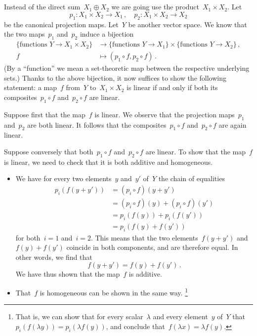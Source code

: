 \subsection{}

Instead of the direct sum~$X_1 ⊕ X_2$ we are going use the product~$X_1 × X_2$.
Let
\[
	p_1 \colon X_1 × X_2 \to X_1 \,,
	\quad
	p_2 \colon X_1 × X_2 \to X_2
\]
be the canonical projection maps.
Let~$Y$ be another vector space.
We know that the two maps~$p_1$ and~$p_2$ induce a bijection
\begin{align*}
	\{ \text{functions~$\textstyle Y \to X_1 × X_2$} \}
	&\to
	\{ \text{functions~$\textstyle Y \to X_1$} \}
	×
	\{ \text{functions~$\textstyle Y \to X_2$} \} \,,
	\\
	f
	&\mapsto
	(p_1 ∘ f, p_2 ∘ f) \,.
\end{align*}
(By a \enquote{function} we mean a set-theoretic map between the respective underlying sets.)
Thanks to the above bijection, it now suffices to show the following statement:
a map~$f$ from~$Y$ to~$X_1 × X_2$ is linear if and only if both its composites~$p_1 ∘ f$ and~$p_2 ∘ f$ are linear.

Suppose first that the map~$f$ is linear.
We observe that the projection maps~$p_1$ and~$p_2$ are both linear.
It follows that the composites~$p_1 ∘ f$ and~$p_2 ∘ f$ are again linear.

Suppose conversely that both~$p_1 ∘ f$ and~$p_2 ∘ f$ are linear.
To show that the map~$f$ is linear, we need to check that it is both additive and homogeneous.
\begin{itemize}

	\item
		We have for every two elements~$y$ and~$y'$ of~$Y$ the chain of equalities
		\begin{align*}
			p_i(f(y + y'))
			&=
			(p_i ∘ f)(y + y')
			\\
			&=
			(p_i ∘ f)(y) + (p_i ∘ f)(y')
			\\
			&=
			p_i(f(y)) + p_i(f(y'))
			\\
			&=
			p_i( f(y) + f(y') )
		\end{align*}
		for both~$i = 1$ and~$i = 2$.
		This means that the two elements~$f(y + y')$ and~$f(y) + f(y')$ coincide in both components, and are therefore equal.
		In other words, we find that
		\[
			f(y + y') = f(y) + f(y') \,.
		\]
		We have thus shown that the map~$f$ is additive.

	\item
		That~$f$ is homogeneous can be shown in the same way.%
		\footnote{
			That is, we can show that for every scalar~$λ$ and every element~$y$ of~$Y$ that~$p_i(f(λ y)) = p_i(λ f(y))$, and conclude that~$f(λ x) = λ f(y)$.
		}

\end{itemize}
